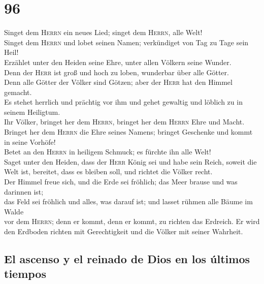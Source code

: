 \hypertarget{section-95}{%
\section{96}\label{section-95}}

 Singet dem \textsc{Herrn} ein neues Lied; singet dem
\textsc{Herrn}, alle Welt!\\
 Singet dem \textsc{Herrn} und lobet seinen Namen;
verkündiget von Tag zu Tage sein Heil!\\
 Erzählet unter den Heiden seine Ehre, unter allen Völkern
seine Wunder.\\
 Denn der \textsc{Herr} ist groß und hoch zu loben,
wunderbar über alle Götter.\\
 Denn alle Götter der Völker sind Götzen; aber der
\textsc{Herr} hat den Himmel gemacht.\\
 Es stehet herrlich und prächtig vor ihm und gehet
gewaltig und löblich zu in seinem Heiligtum.\\
 Ihr Völker, bringet her dem \textsc{Herrn}, bringet her
dem \textsc{Herrn} Ehre und Macht.\\
 Bringet her dem \textsc{Herrn} die Ehre seines Namens;
bringet Geschenke und kommt in seine Vorhöfe!\\
 Betet an den \textsc{Herrn} in heiligem Schmuck; es
fürchte ihn alle Welt!\\
 Saget unter den Heiden, dass der \textsc{Herr} König sei
und habe sein Reich, soweit die Welt ist, bereitet, dass es bleiben
soll, und richtet die Völker recht.\\
 Der Himmel freue sich, und die Erde sei fröhlich; das
Meer brause und was darinnen ist;\\
 das Feld sei fröhlich und alles, was darauf ist; und
lasset rühmen alle Bäume im Walde\\
 vor dem \textsc{Herrn}; denn er kommt, denn er kommt, zu
richten das Erdreich. Er wird den Erdboden richten mit Gerechtigkeit und
die Völker mit seiner Wahrheit.

\hypertarget{el-ascenso-y-el-reinado-de-dios-en-los-uxfaltimos-tiempos}{%
\subsection{El ascenso y el reinado de Dios en los últimos
tiempos}\label{el-ascenso-y-el-reinado-de-dios-en-los-uxfaltimos-tiempos}}

